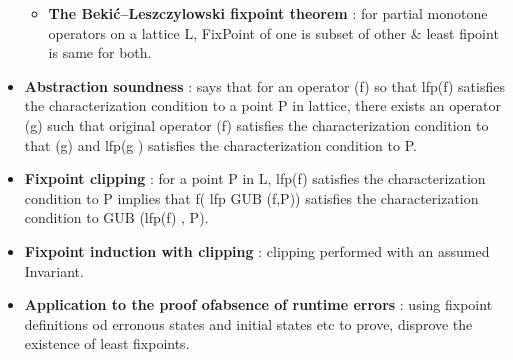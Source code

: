 \begin{itemize}
{\begin{itemize}
{		for comparable operators on complete lattice, is operator f satisfies the characterization condition to operator g for a Lattice L, then lfp (f) also  satisfies the characterization condition to lfp(g). 
		}

		\item{\textbf{The Bekić–Leszczylowski fixpoint theorem} : for partial monotone operators on a lattice L, FixPoint of one is subset of other \& least fipoint is same for both.
		}

	\end{itemize}
	}

	\item{\textbf{Abstraction soundness} : says that for an operator (f) so that lfp(f) satisfies the characterization condition to a point P in lattice, there exists an operator (g) such that original operator (f) satisfies the characterization condition to that (g) and lfp(g ) satisfies the characterization condition to P.
	}

	\item{\textbf{Fixpoint clipping} : for a point P in L, lfp(f) satisfies the characterization condition to P implies that f( lfp GUB (f,P)) satisfies the characterization condition to GUB (lfp(f) , P).
	}
	
	\item{\textbf{Fixpoint induction with clipping} : clipping performed with an assumed Invariant.
	}

	\item{\textbf{Application to the proof ofabsence of runtime errors} : using fixpoint definitions od erronous states and initial states etc to prove, disprove the existence of least fixpoints.
	}

\end{itemize}
